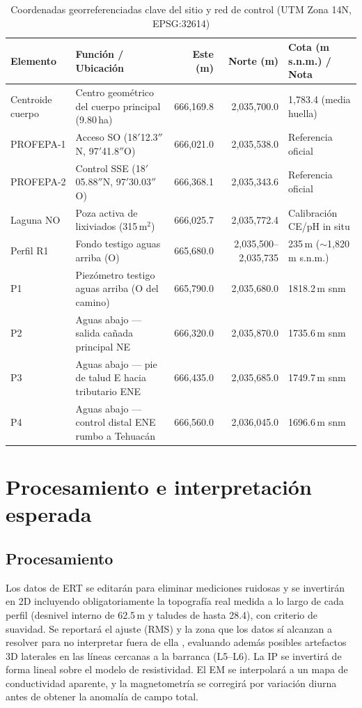 \begin{table}[!t]
\caption{Coordenadas georreferenciadas clave del sitio y red de control (UTM Zona 14N, EPSG:32614)}
\label{tab:coord}
\centering
\small\setlength{\tabcolsep}{3pt}
\begin{tabular}{@{}llrrl@{}}
\toprule
Elemento & Función / Ubicación & Este (m) & Norte (m) & Cota (m s.n.m.) / Nota\\
\midrule
Centroide cuerpo & Centro geométrico del cuerpo principal (9.80\,ha) & 666,169.8 & 2,035,700.0 & 1,783.4 (media huella)\\
PROFEPA-1 & Acceso SO (18\textdegree24$'$12.3$''$N, 97\textdegree25$'$41.8$''$O) & 666,021.0 & 2,035,538.0 & Referencia oficial\\
PROFEPA-2 & Control SSE (18\textdegree24$'$05.88$''$N, 97\textdegree25$'$30.03$''$O) & 666,368.1 & 2,035,343.6 & Referencia oficial\\
Laguna NO & Poza activa de lixiviados (315\,m$^2$) & 666,025.7 & 2,035,772.4 & Calibración CE/pH in situ\\
Perfil R1 & Fondo testigo aguas arriba (O) & 665,680.0 & 2,035,500--2,035,735 & 235\,m ($\sim$1,820\,m s.n.m.)\\
P1 & Piezómetro testigo aguas arriba (O del camino) & 665,790.0 & 2,035,680.0 & 1818.2\,m snm\\
P2 & Aguas abajo --- salida cañada principal NE & 666,320.0 & 2,035,870.0 & 1735.6\,m snm\\
P3 & Aguas abajo --- pie de talud E hacia tributario ENE & 666,435.0 & 2,035,685.0 & 1749.7\,m snm\\
P4 & Aguas abajo --- control distal ENE rumbo a Tehuacán & 666,560.0 & 2,036,045.0 & 1696.6\,m snm\\
\bottomrule
\end{tabular}
\end{table}

\section{Procesamiento e interpretación esperada}
\subsection{Procesamiento}
Los datos de ERT se editarán para eliminar mediciones ruidosas y se invertirán en 2D incluyendo obligatoriamente la topografía real medida a lo largo de cada perfil (desnivel interno de 62.5\,m y taludes de hasta 28.4\textdegree), con criterio de suavidad. Se reportará el ajuste (RMS) y la zona que los datos sí alcanzan a resolver para no interpretar fuera de ella \cite{loke1996}, evaluando además posibles artefactos 3D laterales en las líneas cercanas a la barranca (L5--L6). La IP se invertirá de forma lineal sobre el modelo de resistividad. El EM se interpolará a un mapa de conductividad aparente, y la magnetometría se corregirá por variación diurna antes de obtener la anomalía de campo total.

